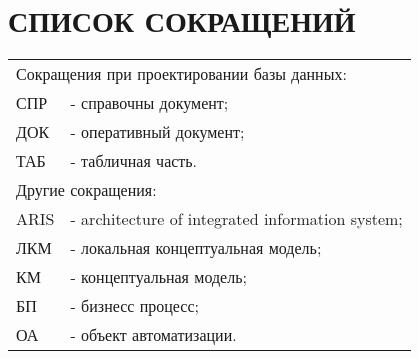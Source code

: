 {}
\section*{СПИСОК СОКРАЩЕНИЙ}

\begin{tabular}{ll}
    \multicolumn{2}{l}{Сокращения при проектировании базы данных:}\\
    СПР  & - справочны документ; \\
    ДОК  & - оперативный документ; \\
    ТАБ  & - табличная часть. \\
    \multicolumn{2}{l}{Другие сокращения:}\\
    ARIS & - architecture of integrated information system;\\
    ЛКМ  & - локальная концептуальная модель;\\ 
    КМ   & - концептуальная модель;\\
    БП   & - бизнесс процесс;\\
    ОА   & - объект автоматизации.\\
\end{tabular}

\newpage
